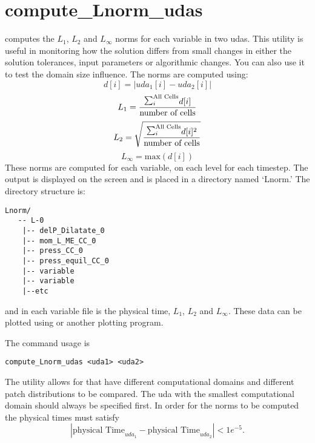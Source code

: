 \section{compute\_Lnorm\_udas}
 computes the $L_1$, $L_2$ and $L_\infty$
norms for each variable in two udas.  This utility is useful in
monitoring how the solution differs from small changes in either the
solution tolerances, input parameters or algorithmic changes.  You can
also use it to test the domain size influence.  The norms are computed
using:
%
\begin{equation}
  d[i] = |uda_1[i] - uda_2[i]|
\end{equation}
%
\begin{equation}
  L_1 = \frac{\raise1.5pt\hbox{$\sum_i^\text{All Cells}$}d[i]}{\text{number of cells}}
\end{equation}
%
\begin{equation}
  L_2 = \sqrt{ \frac{\raise1.5pt\hbox{$\sum_i^\text{All Cells}$}d[i]^2}{\text{number of cells}} }
\end{equation}
%
\begin{equation}
  L_\infty = \text{max}(d[i])
\end{equation}
%
These norms are computed for each 
variable, on each level for each timestep.  The output is displayed on
the screen and is placed in a directory named `Lnorm.'  The directory
structure is:
%
\begin{Verbatim}[fontsize=\footnotesize]
 Lnorm/
   -- L-0
    |-- delP_Dilatate_0
    |-- mom_L_ME_CC_0
    |-- press_CC_0
    |-- press_equil_CC_0
    |-- variable
    |-- variable
    |--etc
\end{Verbatim}
%
and in each variable file is the physical time, $L_1$, $L_2$ and $L_\infty.$  These data can be plotted using  or another plotting program.

The command usage is
%
\begin{Verbatim}[fontsize=\footnotesize]
  compute_Lnorm_udas <uda1> <uda2>
\end{Verbatim}
%
The utility allows for  that have different computational
domains and different patch distributions to be compared.  The uda
with the smallest computational domain should always be specified
first.
%
In order for the norms to be computed the physical times must satisfy 
\begin{equation*}
| \text{physical Time}_{uda_1} - \text{physical Time}_{uda_2}| < 1e^{-5}.
\end{equation*} 

